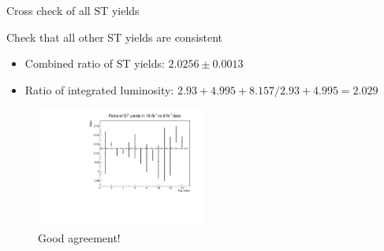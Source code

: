 \documentclass{beamer}
\begin{document}
\begin{frame}{Cross check of all ST yields}
  \begin{center}
    {\large Check that all other ST yields are consistent}
  \end{center}
  \vspace{0.1cm}
  \begin{itemize}
    \item{Combined ratio of ST yields: $2.0256 \pm 0.0013$}
    \item{Ratio of integrated luminosity: $2.93 + 4.995 + 8.157/2.93 + 4.995 = 2.029$}
  \end{itemize}
  \begin{figure}
    \centering
    \includegraphics[width = 0.5\textwidth]{Plots/Ratio_ST_yields_16_8_invfb.pdf}
    \caption{Good agreement!}
  \end{figure}
\end{frame}
\end{document}
